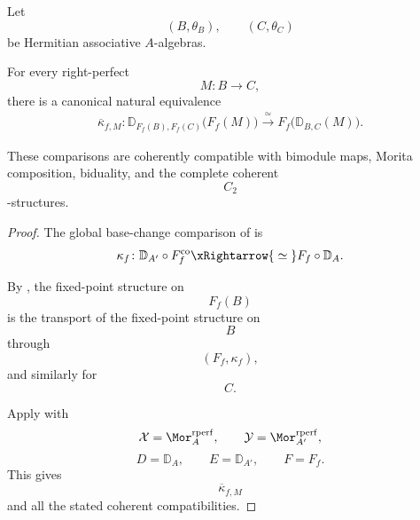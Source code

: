 \begin{proposition}
\label{prop:base-change-transported-hom-duality}
Let
\[
    (B,\theta_B),
    \qquad
    (C,\theta_C)
\]
be Hermitian associative $A$-algebras.

For every right-perfect
\[
    M
    \colon
    B
    \longrightarrow
    C,
\]
there is a canonical natural equivalence
\[
\begin{aligned}
    \overline\kappa_{f,M}
    \colon
    \mathbb D_{F_f(B),F_f(C)}
    \bigl(
        F_f(M)
    \bigr)
    \xrightarrow{\;\simeq\;}
    F_f
    \bigl(
        \mathbb D_{B,C}(M)
    \bigr).
\end{aligned}
\]

These comparisons are coherently compatible with bimodule maps, Morita
composition, biduality, and the complete coherent
\[
    C_2
\]
-structures.
\end{proposition}

\begin{proof}
The global base-change comparison of
is
\[
    \kappa_f
    \colon
    \mathbb D_{A'}
    \circ
    F_f^{\mathrm{co}}
    \xRightarrow{\;\simeq\;}
    F_f
    \circ
    \mathbb D_A.
\]

By
,
the fixed-point structure on
\[
    F_f(B)
\]
is the transport of the fixed-point structure on
\[
    B
\]
through
\[
    (F_f,\kappa_f),
\]
and similarly for
\[
    C.
\]

Apply
with
\[
    \mathcal X
    =
    \Mor_A^{\mathrm{rperf}},
    \qquad
    \mathcal Y
    =
    \Mor_{A'}^{\mathrm{rperf}},
\]
\[
    D
    =
    \mathbb D_A,
    \qquad
    E
    =
    \mathbb D_{A'},
    \qquad
    F
    =
    F_f.
\]
This gives
\[
    \overline\kappa_{f,M}
\]
and all the stated coherent compatibilities.
\end{proof}

